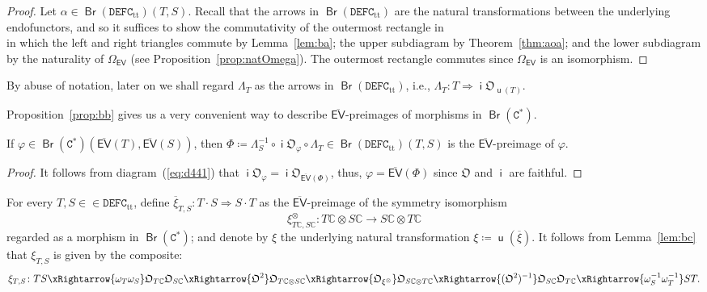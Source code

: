 \documentclass[10pt]{simplearticle}
\newcommand{\tikzinput}[1]{}
\newcommand{\DEFC}{\mathbb{\mathtt{DEFC}}}
\newcommand{\Cstar}{\mathtt{C^{*}}}
\newcommand{\mathsb}[1]{\boldsymbol{\mathsf{#1}}}
\newcommand{\Br}{\operatorname{\mathsb{Br}}}
\renewcommand{\i}{\operatorname{\mathsb i}}
\renewcommand{\u}{\operatorname{\mathsb u}}
\newcommand{\EV}{\mathsb{EV}}
\newcommand{\ttt}{\operatorname{tt}}
\begin{document}
\begin{proof}
Let $\alpha\in\Br(\DEFC_{\ttt})(T,S)$. Recall that the arrows in
$\Br(\DEFC_{\ttt})$ are the natural transformations between the underlying
endofunctors, and so it suffices to show the commutativity of the
outermost rectangle in
\begin{equation}
\tikzinput{d441}\label{eq:d441}
\end{equation}
in which the left and right triangles commute by Lemma~\ref{lem:ba};
the upper subdiagram by Theorem~\ref{thm:aoa}; and the lower subdiagram
by the naturality of $\Omega_{\EV}$ (see Proposition~\ref{prop:natOmega}).
The outermost rectangle commutes since $\Omega_{\EV}$ is an isomorphism.
\end{proof}

\begin{rem}
By abuse of notation, later on we shall regard $\Lambda_{T}$ as the
arrows in $\Br(\DEFC_{\ttt})$, i.e., $\Lambda_{T}\colon T\Rightarrow\i\mathfrak{O}_{\u(T)}$.
\end{rem}

Proposition~\ref{prop:bb} gives us a very convenient way to describe
$\overline{\EV}$-preimages of morphisms in $\Br(\Cstar)$.
\begin{lem}\label{lem:bc}
If $\varphi\in\Br(\Cstar)(\overline{\EV}(T),\overline{\EV}(S))$,
then $\Phi\coloneqq\Lambda^{-1}_{S}\circ\i\mathfrak{O}_{\varphi}\circ\Lambda_{T}\in\Br(\DEFC_{\ttt})(T,S)$
is the $\overline{\EV}$-preimage of $\varphi$.
\end{lem}

\begin{proof}
It follows from diagram~(\ref{eq:d441}) that $\i\mathfrak{O}_{\varphi}=\i\mathfrak{O}_{\overline{\EV}(\Phi)}$,
thus, $\varphi=\overline{\EV}(\Phi)$ since $\mathfrak{O}$ and $\i$
are faithful.
\end{proof}

\begin{defn}\label{def:xitt}
For every $T,S\in\in\DEFC_{\ttt}$, define
$\overline{\xi}_{T,S}\colon T\cdot S\Rightarrow S\cdot T$ as the
$\overline{\EV}$-preimage of the symmetry isomorphism
\[
\xi^{\otimes}_{T\mathbb{C},S\mathbb{C}}\colon T\mathbb{C}\otimes S\mathbb{C}\to S\mathbb{C}\otimes T\mathbb{C}
\]
regarded as a morphism in $\Br(\Cstar)$; and denote by $\xi$ the
underlying natural transformation $\xi\coloneqq\u(\overline{\xi})$.
It follows from Lemma~\ref{lem:bc} that $\xi_{T,S}$ is given by
the composite:
\[
\xi_{T,S}\colon TS\xRightarrow{\omega_{T}\omega_{S}}\mathfrak{O}_{T\mathbb{C}}\mathfrak{O}_{S\mathbb{C}}\xRightarrow{\mathfrak{O}^{2}}\mathfrak{O}_{T\mathbb{C}\otimes S\mathbb{C}}\xRightarrow{\mathfrak{O}_{\xi^{\otimes}}}\mathfrak{O}_{S\mathbb{C}\otimes T\mathbb{C}}\xRightarrow{(\mathfrak{O}^{2})^{-1}}\mathfrak{O}_{S\mathbb{C}}\mathfrak{O}_{T\mathbb{C}}\xRightarrow{\omega^{-1}_{S}\omega^{-1}_{T}}ST.
\]
\end{defn}
\end{document}
